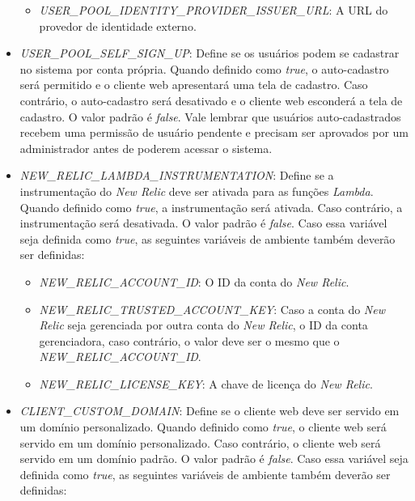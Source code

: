 \begin{itemize}
\begin{itemize}
        \item \textit{USER\_POOL\_IDENTITY\_PROVIDER\_ISSUER\_URL}: A URL do provedor de identidade externo.
    \end{itemize}

    \item \textit{USER\_POOL\_SELF\_SIGN\_UP}: Define se os usuários podem se cadastrar no sistema por conta própria. Quando definido como \textit{true}, o auto-cadastro será permitido e o cliente web apresentará uma tela de cadastro. Caso contrário, o auto-cadastro será desativado e o cliente web esconderá a tela de cadastro. O valor padrão é \textit{false}. Vale lembrar que usuários auto-cadastrados recebem uma permissão de usuário pendente e precisam ser aprovados por um administrador antes de poderem acessar o sistema.

    \item \textit{NEW\_RELIC\_LAMBDA\_INSTRUMENTATION}: Define se a instrumentação do \textit{New Relic} deve ser ativada para as funções \textit{Lambda}. Quando definido como \textit{true}, a instrumentação será ativada. Caso contrário, a instrumentação será desativada. O valor padrão é \textit{false}. Caso essa variável seja definida como \textit{true}, as seguintes variáveis de ambiente também deverão ser definidas:

    \begin{itemize}

        \item \textit{NEW\_RELIC\_ACCOUNT\_ID}: O ID da conta do \textit{New Relic}.

        \item \textit{NEW\_RELIC\_TRUSTED\_ACCOUNT\_KEY}: Caso a conta do \textit{New Relic} seja gerenciada por outra conta do \textit{New Relic}, o ID da conta gerenciadora, caso contrário, o valor deve ser o mesmo que o \textit{NEW\_RELIC\_ACCOUNT\_ID}.

        \item \textit{NEW\_RELIC\_LICENSE\_KEY}: A chave de licença do \textit{New Relic}.

    \end{itemize}

    \item \textit{CLIENT\_CUSTOM\_DOMAIN}: Define se o cliente web deve ser servido em um domínio personalizado. Quando definido como \textit{true}, o cliente web será servido em um domínio personalizado. Caso contrário, o cliente web será servido em um domínio padrão. O valor padrão é \textit{false}. Caso essa variável seja definida como \textit{true}, as seguintes variáveis de ambiente também deverão ser definidas:


\end{itemize}
